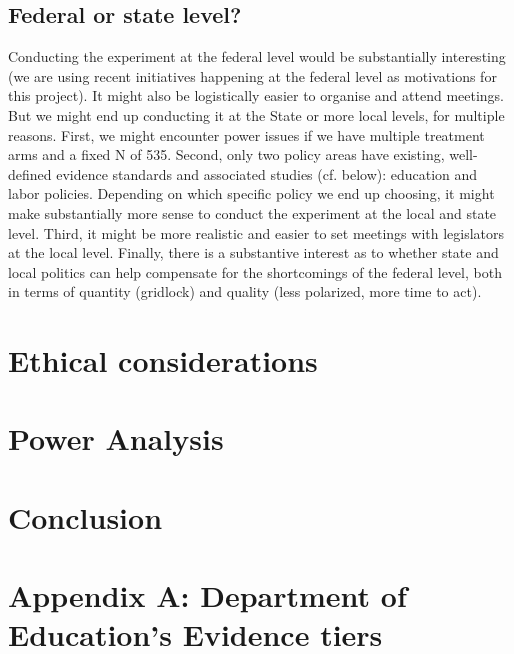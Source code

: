 \documentclass[12pt,final,fleqn]{article}
\theoremstyle{plain}
\begin{document}
\subsection{Federal or state level?} \label{sec: Level}

Conducting the experiment at the federal level would be substantially interesting (we are using recent initiatives happening at the federal level as motivations for this project). It might also be logistically easier to organise and attend meetings. But we might end up conducting it at the State or more local levels, for multiple reasons. First, we might encounter power issues if we have multiple treatment arms and a fixed N of 535. Second, only two policy areas have existing, well-defined evidence standards and associated studies (cf. below): education and labor policies. Depending on which specific policy we end up choosing, it might make substantially more sense to conduct the experiment at the local and state level. Third, it might be more realistic and easier to set meetings with legislators at the local level. Finally, there is a substantive interest as to whether state and local politics can help compensate for the shortcomings of the federal level, both in terms of quantity (gridlock) and quality (less polarized, more time to act). 


\section{Ethical considerations} \label{sec:Ethics}



\section{Power Analysis} \label{sec:Power}


\section{Conclusion} \label{sec:Conclusion}


\clearpage
\pagebreak


\pagebreak

\section{Appendix A: Department of Education's Evidence tiers} \label{sec: DoE}
\end{document}
